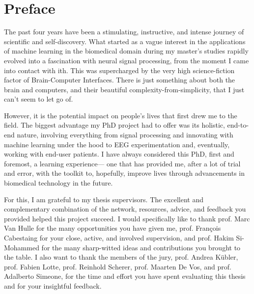 \chapter*{Preface}

The past four years have been a stimulating, instructive, and intense
journey of scientific and self-discovery. What started as a vague interest
in the applications of machine learning in the biomedical domain during
my master's studies rapidly evolved into a fascination with neural
signal processing, from the moment I came into contact with ith.
This was supercharged by the very high science-fiction factor
of Brain-Computer Interfaces.
There is just something about both the brain and computers, and
their beautiful complexity-from-simplicity, that I just can't
seem to let go of.

However, it is the potential impact on people's lives that first drew
me to the field. The biggest advantage my PhD project had to offer was
its holistic, end-to-end nature, involving everything from signal
processing and innovating with machine learning under the hood to EEG
experimentation and, eventually, working with end-user patients. I have
always considered this PhD, first and foremost, a learning experience—
one that has provided me, after a lot of trial and error, with the
toolkit to, hopefully, improve lives through advancements in biomedical
technology in the future.

For this, I am grateful to my thesis supervisors. The excellent and
complementary combination of the network, resources, advice, and
feedback you provided helped this project succeed. I would specifically
like to thank prof. Marc Van Hulle for the many opportunities you have
given me, prof. François Cabestaing for your close, active, and
involved supervision, and prof. Hakim Si-Mohammed for the many
sharp-witted ideas and contributions you brought to the table. I also
want to thank the members of the jury, prof. Andrea Kübler, prof.
Fabien Lotte, prof. Reinhold Scherer, prof. Maarten De Vos, and prof.
Adalberto Simeone, for the time and effort you have spent evaluating
this thesis and for your insightful feedback.


